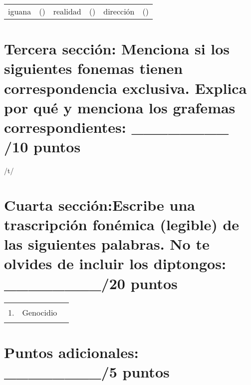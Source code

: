 \documentclass[12pt]{exam}
\begin{document}
	\begin{tabular}{lclclc}
		\hspace{20mm} iguana		&	\hspace{5mm}(\hspace{2mm})	\hspace{5mm} & realidad	    & \hspace{5mm}(\hspace{2mm}) \hspace{5mm} & dirección	& \hspace{5mm}(\hspace{2mm})\\
	\end{tabular}







\section{Tercera sección: Menciona si los siguientes fonemas tienen correspondencia exclusiva. Explica por qué y menciona los grafemas correspondientes: \_\_\_\_\_\_\_\_ /10 puntos}

	\begin{questions}
		\question /t/ 
		\fillwithlines{.75in}
	\end{questions}







\section{Cuarta sección:Escribe una trascripción fonémica (legible) de las siguientes palabras. No te olvides de incluir los diptongos: \_\_\_\_\_\_\_\_/20 puntos}


\renewcommand{\arraystretch}{1.75}
	\begin{tabular}{llc}
		1.  & Genocidio		& \hspace{5mm}\rule{55mm}{.3mm} \\
	\end{tabular}




\section{Puntos adicionales: \_\_\_\_\_\_\_\_/5 puntos}	
\end{document}

